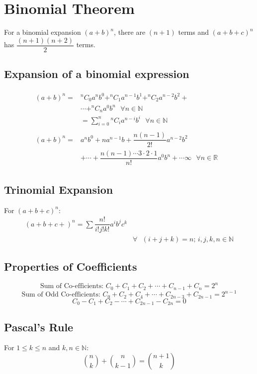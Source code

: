 \chapter{Binomial Theorem}
For a binomial expansion $(a+b)^n$, there are $(n+1)$ terms and $(a+b+c)^n$ has $\dfrac{(n+1)(n+2)}{2}$ terms.


\section{Expansion of a binomial expression}
\begin{eqnarray}
	\begin{aligned}
			(a+b)^n= & ^nC_0 a^n b^0+^nC_1 a^{n-1} b^1+^nC_2 a^{n-2} b^2+ & \\ & \cdots+^nC_n a^0 b^n\text{ }\forall n \in \mathbb{N} & \\ & =\sum_{i=0}^{n} {^nC_{i}} a^{n-i} b^i\text{ }\forall n \in \mathbb{N}
	\end{aligned}\\
	\begin{aligned}
			(a+b)^n= & a^n b^0+na^{n-1}b+\dfrac{n(n-1)}{2!}a^{n-2}b^2 & \\ & +\cdots+\dfrac{n(n-1)\cdots3\cdot2\cdot1}{n!} a^0 b^n+\cdots\infty \text{ }\forall n \in \mathbb{R}
	\end{aligned}
\end{eqnarray}


\section{Trinomial Expansion}
For $(a+b+c)^n$:
\begin{equation}
	\begin{split}
		(a+b+c+)^n=\sum \dfrac{n!}{i! j! k!} a^i b^j c^k & \\ & \forall\text{ }(i+j+k)=n\text{; }i,j,k,n \in \mathbb{N}
	\end{split}
\end{equation}


\section{Properties of Coefficients}
\begin{equation}
	\text{Sum of Co-efficients: }C_0+C_1+C_2+\cdots+C_{n-1}+C_n=2^n
\end{equation}
\begin{equation}
	\text{Sum of Odd Co-efficients: }C_0+C_2+C_4+\cdots+C_{2n-3}+C_{2n-1}=2^{n-1}
\end{equation}
\begin{equation}
	C_0-C_1+C_2-\cdots+C_{2n-1}-C_{2n}=0
\end{equation}


\section{Pascal's Rule}
For $1 \leq k \leq n$ and  $k,n \in \mathbb{N}$:
\begin{equation}
	{\binom{n}{k}}+{\binom{n}{k-1}} ={\binom{n+1}{k}}
\end{equation}
